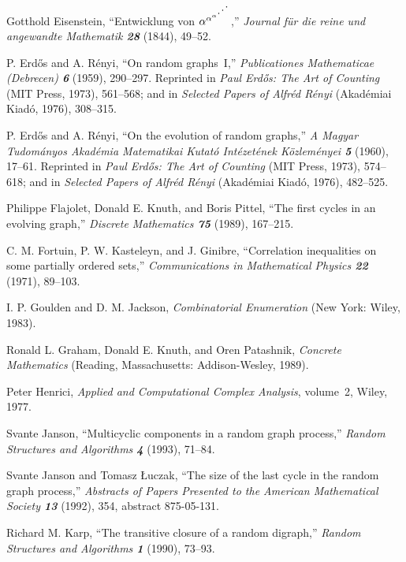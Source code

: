 \smallskip
\bib [\Eis]\enspace
Gotthold Eisenstein, ``Entwicklung von $\alpha^{\alpha^{\alpha^{\dddots}}}$,''
{\sl Journal f\"ur die reine und angewandte Mathematik\/ \bf 28} 
(1844), 49--52.

\smallskip
\bib [\ERo]\enspace
P. Erd{\H o}s and A. R\'enyi, ``On random graphs~I,'' {\sl
Publicationes Mathematicae (Debrecen) \bf 6} (1959), 
290--297. Reprinted in {\sl
Paul Erd{\H o}s: The Art of Counting\/} (MIT Press, 1973), 561--568;
and in {\sl Selected Papers of Alfr\'ed R\'enyi\/} (Akad\'emiai Kiad\'o,
1976), 308--315.

\smallskip
\bib [\ER]\enspace
P. Erd{\H o}s and A. R\'enyi, ``On the evolution of random graphs,''
{\sl A Magyar Tudom\'anyos Akad\'emia Matematikai Kutat\'o
Int\'ezet\'enek K\"ozlem\'enyei\/
\bf 5} (1960), 17--61.
Reprinted in {\sl
Paul Erd{\H o}s: The Art of Counting\/} (MIT Press, 1973), 574--618;
and in {\sl Selected Papers of Alfr\'ed R\'enyi\/} (Akad\'emiai Kiad\'o,
1976), 482--525.

\smallskip
\bib [\FKP]\enspace
Philippe Flajolet, Donald E. Knuth, and Boris Pittel,
``The first cycles in an evolving graph,'' {\sl Discrete Mathematics\/
\bf 75} (1989), 167--215.

\smallskip
\bib [\FKG]\enspace
C. M. Fortuin, P. W. Kasteleyn, and J. Ginibre, ``Correlation
inequalities on some partially ordered sets,'' {\sl Communications in
Mathematical Physics\/ \bf 22} (1971), 89--103.

\smallskip
\bib [\GJ]\enspace
I. P. Goulden and D. M. Jackson, {\sl Combinatorial Enumeration\/}
(New York: Wiley, 1983).

\smallskip
\bib [\CM]\enspace
Ronald L. Graham, Donald E. Knuth, and Oren Patashnik, {\sl Concrete
Mathematics\/} (Reading, Massachusetts: Addison-Wesley, 1989).

\smallskip
\bib [\Hen]\enspace
Peter Henrici, {\sl Applied and Computational Complex Analysis}, volume~2,
Wiley, 1977.

\smallskip
\bib [\Jan]\enspace
Svante Janson, ``Multicyclic components in a random graph process,''
{\sl Random Structures and Algorithms\/ \bf4} (1993), 71--84.

\smallskip
\bib [\JL]\enspace
Svante Janson and Tomasz \L uczak, ``The size of the last cycle in the
random graph process,'' {\sl Abstracts of Papers Presented to the
American Mathematical Society\/ \bf13} (1992), 354, abstract 875-05-131.

\smallskip
\bib [\Kar]\enspace
Richard M. Karp, ``The transitive closure of a random digraph,'' {\sl Random
Structures and Algorithms\/ \bf1} (1990), 73--93.

